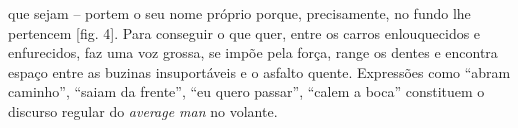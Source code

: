 \begin{multicols}{2}
que sejam – portem o seu nome próprio porque,\allowbreak{} precisamente,\allowbreak{} no fundo lhe pertencem [fig.\allowbreak{} 4].\allowbreak{} Para conseguir o que quer,\allowbreak{} entre os carros enlouquecidos e enfurecidos,\allowbreak{} faz uma voz grossa,\allowbreak{} se impõe pela força,\allowbreak{} range os dentes e encontra espaço entre as buzinas insuportáveis e o asfalto quente.\allowbreak{} Expressões como “abram caminho”,\allowbreak{} “saiam da frente”,\allowbreak{} “eu quero passar”,\allowbreak{} “calem a boca” constituem o discurso regular do \textit{average man} no volante.\allowbreak{}
\par
{
}
\par


\end{multicols}
